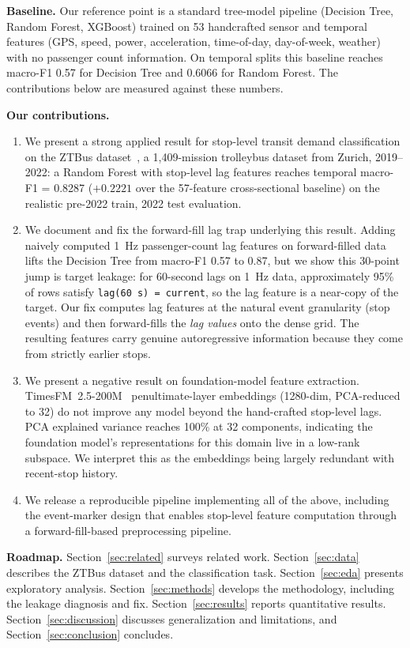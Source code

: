 \textbf{Baseline.} Our reference point is a standard tree-model pipeline
(Decision Tree, Random Forest, XGBoost) trained on 53 handcrafted sensor
and temporal features (GPS, speed, power, acceleration, time-of-day,
day-of-week, weather) with no passenger count information. On temporal
splits this baseline reaches macro-F1 0.57 for Decision Tree and 0.6066
for Random Forest. The contributions below are measured against these
numbers.

\textbf{Our contributions.}
\begin{enumerate}
  \item We present a strong applied result for stop-level transit demand
    classification on the ZTBus dataset~\cite{widmer2023ztbus}, a
    1,409-mission trolleybus dataset from Zurich, 2019--2022: a Random
    Forest with stop-level lag features reaches temporal macro-F1 =
    0.8287 ($+0.2221$ over the 57-feature cross-sectional baseline) on
    the realistic pre-2022 train, 2022 test evaluation.
  \item We document and fix the forward-fill lag trap underlying this
    result. Adding naively computed 1~Hz passenger-count lag features on
    forward-filled data lifts the Decision Tree from macro-F1 0.57 to
    0.87, but we show this 30-point jump is target leakage: for
    60-second lags on 1~Hz data, approximately 95\% of rows satisfy
    \texttt{lag(60\,s) = current}, so the lag feature is a near-copy of
    the target. Our fix computes lag features at the natural event
    granularity (stop events) and then forward-fills the \emph{lag
    values} onto the dense grid. The resulting features carry genuine
    autoregressive information because they come from strictly earlier
    stops.
  \item We present a negative result on foundation-model feature
    extraction. TimesFM~2.5-200M~\cite{das2024timesfm} penultimate-layer
    embeddings (1280-dim, PCA-reduced to 32) do not improve any model
    beyond the hand-crafted stop-level lags. PCA explained variance
    reaches 100\% at 32 components, indicating the foundation model's
    representations for this domain live in a low-rank subspace. We
    interpret this as the embeddings being largely redundant with
    recent-stop history.
  \item We release a reproducible pipeline implementing all of the
    above, including the event-marker design that enables stop-level
    feature computation through a forward-fill-based preprocessing
    pipeline.
\end{enumerate}

\textbf{Roadmap.} Section~\ref{sec:related} surveys related work.
Section~\ref{sec:data} describes the ZTBus dataset and the classification
task. Section~\ref{sec:eda} presents exploratory analysis.
Section~\ref{sec:methods} develops the methodology, including the leakage
diagnosis and fix. Section~\ref{sec:results} reports quantitative results.
Section~\ref{sec:discussion} discusses generalization and limitations, and
Section~\ref{sec:conclusion} concludes.
